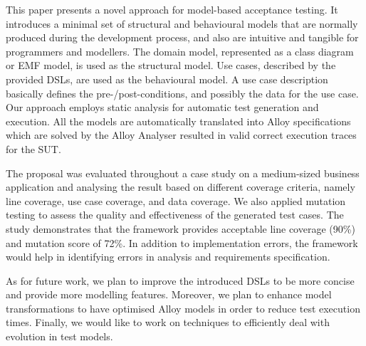 %
%
This paper presents a novel approach for model-based acceptance testing. It introduces a minimal set of structural and behavioural models that are normally produced during the development process, and also are intuitive and tangible for programmers and modellers. The domain model, represented as a class diagram or EMF model, is used as the structural model. Use cases, described by the provided DSLs, are used as the behavioural model. A use case description basically defines the pre-/post-conditions, and possibly the data for the use case.
Our approach employs static analysis for automatic test generation and execution. All the models are automatically translated into Alloy specifications which are solved by the Alloy Analyser resulted in valid correct execution traces for the SUT.

The proposal was evaluated throughout a case study on a medium-sized business application and analysing the result based on different coverage criteria, namely line coverage, use case coverage, and data coverage. We also applied mutation testing to assess the quality and effectiveness of the generated test cases. The study demonstrates that the framework provides acceptable line coverage (90\%) and mutation score of 72\%. In addition to implementation errors, the framework would help in identifying errors in analysis and requirements specification.

As for future work, we plan to improve the introduced DSLs to be more concise and provide more modelling features. Moreover, we plan to enhance model transformations to have optimised Alloy models in order to reduce test execution times. Finally, we would like to work on techniques to efficiently deal with evolution in test models.



